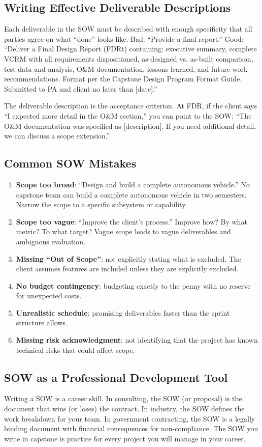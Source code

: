 \subsection{Writing Effective Deliverable Descriptions}
Each deliverable in the SOW must be described with enough specificity that all parties agree on what ``done'' looks like. Bad: ``Provide a final report.'' Good: ``Deliver a Final Design Report (FDRt) containing: executive summary, complete VCRM with all requirements dispositioned, as-designed vs. as-built comparison, test data and analysis, O\&M documentation, lessons learned, and future work recommendations. Format per the Capstone Design Program Format Guide. Submitted to PA and client no later than [date].''

The deliverable description is the acceptance criterion. At FDR, if the client says ``I expected more detail in the O\&M section,'' you can point to the SOW: ``The O\&M documentation was specified as [description]. If you need additional detail, we can discuss a scope extension.''

\subsection{Common SOW Mistakes}
\begin{enumerate}[nosep,leftmargin=1.5em]
\item \textbf{Scope too broad}: ``Design and build a complete autonomous vehicle.'' No capstone team can build a complete autonomous vehicle in two semesters. Narrow the scope to a specific subsystem or capability.
\item \textbf{Scope too vague}: ``Improve the client's process.'' Improve how? By what metric? To what target? Vague scope leads to vague deliverables and ambiguous evaluation.
\item \textbf{Missing ``Out of Scope''}: not explicitly stating what is excluded. The client assumes features are included unless they are explicitly excluded.
\item \textbf{No budget contingency}: budgeting exactly to the penny with no reserve for unexpected costs.
\item \textbf{Unrealistic schedule}: promising deliverables faster than the sprint structure allows.
\item \textbf{Missing risk acknowledgment}: not identifying that the project has known technical risks that could affect scope.
\end{enumerate}

\subsection{SOW as a Professional Development Tool}
Writing a SOW is a career skill. In consulting, the SOW (or proposal) is the document that wins (or loses) the contract. In industry, the SOW defines the work breakdown for your team. In government contracting, the SOW is a legally binding document with financial consequences for non-compliance. The SOW you write in capstone is practice for every project you will manage in your career.



